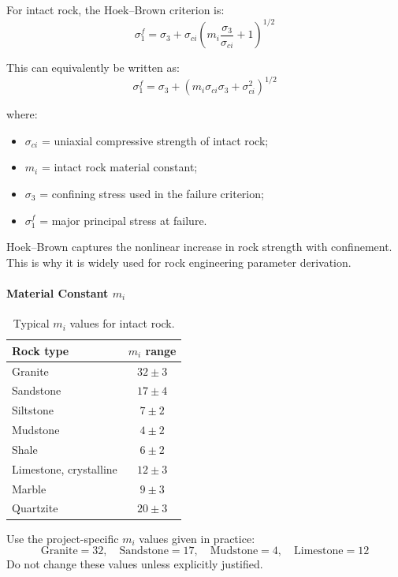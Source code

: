 For intact rock, the Hoek--Brown criterion is:
\[
\sigma_1^f =
\sigma_3 + \sigma_{ci}
\left(
m_i\frac{\sigma_3}{\sigma_{ci}} + 1
\right)^{1/2}
\]

This can equivalently be written as:
\[
\sigma_1^f =
\sigma_3 +
\left(
m_i\sigma_{ci}\sigma_3 + \sigma_{ci}^{2}
\right)^{1/2}
\]

where:
\begin{itemize}
 \item \(\sigma_{ci}\) = uniaxial compressive strength of intact rock;
 \item \(m_i\) = intact rock material constant;
 \item \(\sigma_3\) = confining stress used in the failure criterion;
 \item \(\sigma_1^f\) = major principal stress at failure.
\end{itemize}

\begin{keybox}
Hoek--Brown captures the nonlinear increase in rock strength with confinement. This is
why it is widely used for rock engineering parameter derivation.
\end{keybox}

\paragraph{Material Constant \(m_i\)}

\begin{table}[H]
\centering
\small
\begin{tabularx}{0.75\textwidth}{l c}
\toprule
\textbf{Rock type} & \textbf{\(m_i\) range} \\
\midrule
Granite & \(32 \pm 3\) \\
Sandstone & \(17 \pm 4\) \\
Siltstone & \(7 \pm 2\) \\
Mudstone & \(4 \pm 2\) \\
Shale & \(6 \pm 2\) \\
Limestone, crystalline & \(12 \pm 3\) \\
Marble & \(9 \pm 3\) \\
Quartzite & \(20 \pm 3\) \\
\bottomrule
\end{tabularx}
\caption{Typical \(m_i\) values for intact rock.}
\end{table}

\begin{notebox}
Use the project-specific \(m_i\) values given in practice:
\[
\text{Granite}=32,\quad
\text{Sandstone}=17,\quad
\text{Mudstone}=4,\quad
\text{Limestone}=12
\]
Do not change these values unless explicitly justified.
\end{notebox}

